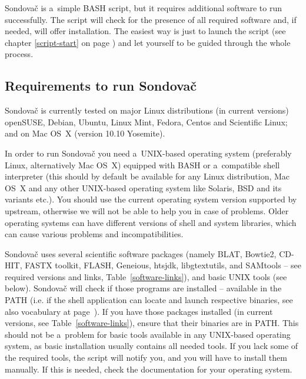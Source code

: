 \documentclass[a4paper, 11pt, twoside]{article}
\begin{document}
Sondovač is a~simple BASH script, but it requires additional software to run successfully. The script will check for the presence of all required software and, if needed, will offer installation. The easiest way is just to launch the script (see chapter \ref{script-start} on page \pageref{script-start}) and let yourself to be guided through the whole process.

\subsection{Requirements to run Sondovač}

Sondovač is currently tested on major Linux distributions (in current versions) openSUSE, Debian, Ubuntu, Linux Mint, Fedora, Centos and Scientific Linux; and on Mac OS~X (version 10.10 Yosemite).

In order to run Sondovač you need a~UNIX-based operating system (preferably Linux, alternatively Mac OS~X) equipped with BASH or a~compatible shell interpreter (this should by default be available for any Linux distribution, Mac OS~X and any other UNIX-based operating system like Solaris, BSD and its variants etc.). You should use the current operating system version supported by upstream, otherwise we will not be able to help you in case of problems. Older operating systems can have different versions of shell and system libraries, which can cause various problems and incompatibilities.

Sondovač uses several scientific software packages (namely BLAT, Bowtie2, CD-HIT, FASTX toolkit, FLASH, Geneious, htsjdk, libgtextutils, and SAMtools -- see required versions and links, Table~\ref{software-links}), and basic UNIX tools (see below). Sondovač will check if those programs are installed -- available in the PATH (i.e. if the shell application can locate and launch respective binaries, see also vocabulary at page~\pageref{vocabulary}). If you have those packages installed (in current versions, see Table~\ref{software-links}), ensure that their binaries are in PATH. This should not be a~problem for basic tools available in any UNIX-based operating system, as basic installation usually contains all needed tools. If you lack some of the required tools, the script will notify you, and you will have to install them manually. If this is needed, check the documentation for your operating system.
\end{document}
